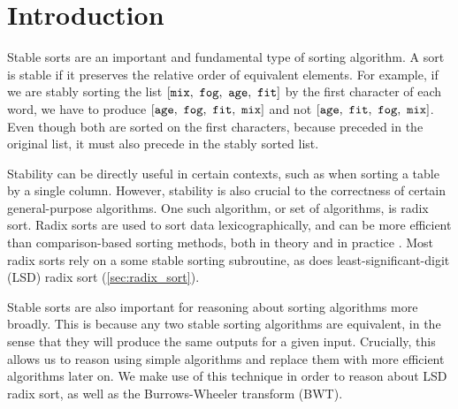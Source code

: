 \documentclass[sigplan,10pt,anonymous,review]{thesis}
\begin{document}


\maketitle

\section{Introduction}
\label{sec:intro}

Stable sorts are an important and fundamental type of sorting
algorithm. A sort is stable if it preserves the relative order of
equivalent elements. For example, if we are stably sorting the list
$[\var{mix},\ \allowbreak\var{fog},\ \allowbreak\var{age},\ \allowbreak\var{fit}]$
by the first character of each word, we have to produce
$[\var{age},\ \allowbreak\var{fog},\ \allowbreak\var{fit},\ \allowbreak\var{mix}]$
and not
$[\var{age},\ \allowbreak\var{fit},\ \allowbreak\var{fog},\ \allowbreak\var{mix}]$.
Even though both are sorted on the first characters, because 
preceded  in the original list, it must also precede
 in the stably sorted list.

Stability can be directly useful in certain contexts, such as when
sorting a table by a single column. However, stability is also crucial
to the correctness of certain general-purpose algorithms. One such
algorithm, or set of algorithms, is radix sort. Radix sorts are used
to sort data lexicographically, and can be more efficient than
comparison-based sorting methods, both in theory and in practice
\cite{McIlroy93,Bentley:1997:FAS:314161.314321,10.1007/978-3-540-89097-3_3}.
Most radix sorts rely on a some stable sorting subroutine, as does
least-significant-digit (LSD) radix sort (\cref{sec:radix_sort}).

Stable sorts are also important for reasoning about sorting algorithms
more broadly. This is because any two stable sorting algorithms are
equivalent, in the sense that they will produce the same outputs for a
given input. Crucially, this allows us to reason using simple
algorithms and replace them with more efficient algorithms later on.
We make use of this technique in order to reason about LSD radix sort,
as well as the Burrows-Wheeler transform (BWT).
\end{document}
